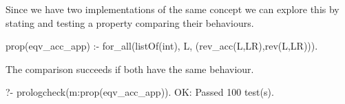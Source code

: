 \documentclass[runningheads,a4paper]{llncs}
\newcommand{\yap}[1]{\lstinline[style=yap]{#1}}
\newcommand{\Yap}[0]{{\sf Yap}}
\newcommand{\plqc}[0]{{\sf PrologCheck}}
\begin{document}
Since we have two implementations of the same concept we can explore
this by stating and testing a property comparing their behaviours.
%
\begin{yapcode}
 prop(eqv_acc_app) :-
   for_all(listOf(int), L, (rev_acc(L,LR),rev(L,LR))).
\end{yapcode}
The comparison succeeds if both have the same behaviour.
%
\begin{yapcode}
   ?- prologcheck(m:prop(eqv_acc_app)).
 OK: Passed 100 test(s).
\end{yapcode}










\end{document}
